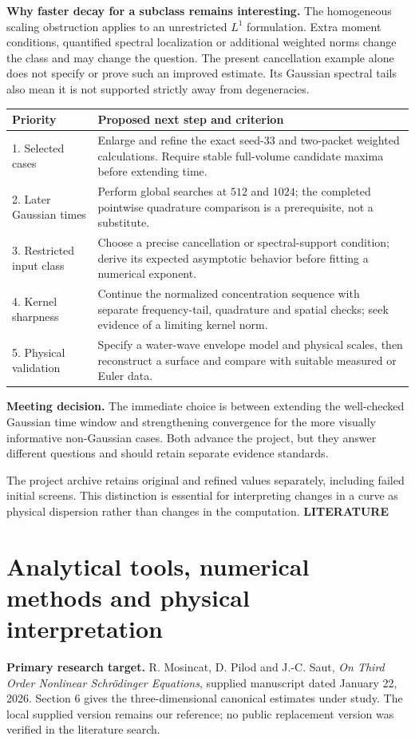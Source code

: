 \documentclass[10pt,letterpaper]{article}
\newcommand{\eyebrow}[1]{{\color{teal}\normalsize\bfseries #1}\par}
\newcommand{\callout}[1]{\par\smallskip\colorbox{pale}{\parbox{.96\linewidth}{\vspace{5pt}#1\vspace{5pt}}}\par\smallskip}
\begin{document}
\textbf{Why faster decay for a subclass remains interesting.} The homogeneous
scaling obstruction applies to an unrestricted $L^1$ formulation. Extra moment
conditions, quantified spectral localization or additional weighted norms change
the class and may change the question. The present cancellation example alone
does not specify or prove such an improved estimate. Its Gaussian spectral tails
also mean it is not supported strictly away from degeneracies.

\begin{center}\begin{tabular}{p{.25\linewidth}p{.65\linewidth}}\toprule
Priority & Proposed next step and criterion\\\midrule
1. Selected cases & Enlarge and refine the exact seed-33 and two-packet weighted
calculations. Require stable full-volume candidate maxima before extending time.\\
2. Later Gaussian times & Perform global searches at $512$ and $1024$; the completed
pointwise quadrature comparison is a prerequisite, not a substitute.\\
3. Restricted input class & Choose a precise cancellation or spectral-support
condition; derive its expected asymptotic behavior before fitting a numerical exponent.\\
4. Kernel sharpness & Continue the normalized concentration sequence with separate
frequency-tail, quadrature and spatial checks; seek evidence of a limiting kernel norm.\\
5. Physical validation & Specify a water-wave envelope model and physical scales,
then reconstruct a surface and compare with suitable measured or Euler data.\\\bottomrule
\end{tabular}\end{center}
\callout{\textbf{Meeting decision.} The immediate choice is between extending the
well-checked Gaussian time window and strengthening convergence for the more
visually informative non-Gaussian cases. Both advance the project, but they answer
different questions and should retain separate evidence standards.}

The project archive retains original and refined values separately, including
failed initial screens. This distinction is essential for interpreting changes
in a curve as physical dispersion rather than changes in the computation.
\newpage
{}\label{literature}
\eyebrow{LITERATURE}
\section*{Analytical tools, numerical methods and physical interpretation}
\textbf{Primary research target.} R. Mosincat, D. Pilod and J.-C. Saut,
\emph{On Third Order Nonlinear Schr\"odinger Equations}, supplied manuscript dated
January 22, 2026. Section 6 gives the three-dimensional canonical estimates under
study. The local supplied version remains our reference; no public replacement
version was verified in the literature search.
\end{document}

